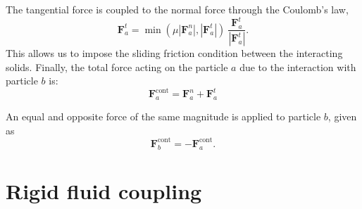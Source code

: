 \documentclass[preprint,12pt]{elsarticle}
\newcommand{\ten}[1]{\ensuremath{\mathbf{#1}}}
\begin{document}
The tangential force is coupled to the normal force through the Coulomb's law,
\begin{equation}
  \label{eq:Coulomb-law}
  \ten{F}_{a}^{t} = \min(\mu |\ten{F}_{a}^{n}|, |\ten{F}_{a}^{t}|) \
  \frac{\ten{F}_{a}^{t}}{|\ten{F}_{a}^{t}|}.
\end{equation}
This allows us to impose the sliding friction condition between the
interacting solids. Finally, the total force acting on the particle $a$ due to
the interaction with particle $b$ is:
\begin{equation}
  \label{eq:contact-force}
  \ten{F}_{a}^{\text{cont}} = \ten{F}_{a}^{n} + \ten{F}_{a}^{t}
\end{equation}

An equal and opposite force of the same magnitude is applied to
particle $b$, given as
\begin{equation}
  \label{eq:contact-force}
  \ten{F}_{b}^{\text{cont}} = - \ten{F}_{a}^{\text{cont}}.
\end{equation}



\FloatBarrier%
\section{Rigid fluid coupling}
\label{sec:rfc}

\end{document}
